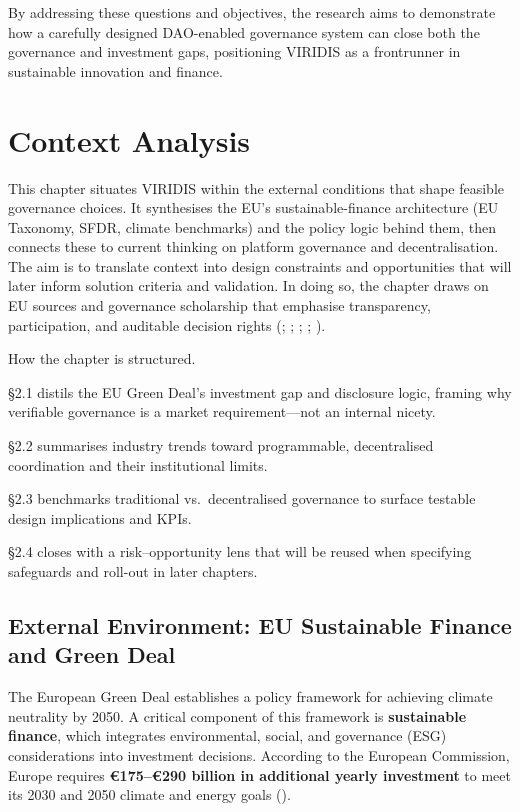 \documentclass[
  english,
  12pt,
  oneside,
  open=any]{scrbook}
\begin{document}
By addressing these questions and objectives, the research aims to
demonstrate how a carefully designed DAO-enabled governance system can
close both the governance and investment gaps, positioning VIRIDIS as a
frontrunner in sustainable innovation and finance.

\chapter{Context Analysis}\label{sec-context-analysis}

This chapter situates VIRIDIS within the external conditions that shape
feasible governance choices. It synthesises the EU's sustainable-finance
architecture (EU Taxonomy, SFDR, climate benchmarks) and the policy
logic behind them, then connects these to current thinking on platform
governance and decentralisation. The aim is to translate context into
design constraints and opportunities that will later inform solution
criteria and validation. In doing so, the chapter draws on EU sources
and governance scholarship that emphasise transparency, participation,
and auditable decision rights
(;
;
; ;
).

How the chapter is structured.

§2.1 distils the EU Green Deal's investment gap and disclosure logic,
framing why verifiable governance is a market requirement---not an
internal nicety.

§2.2 summarises industry trends toward programmable, decentralised
coordination and their institutional limits.

§2.3 benchmarks traditional vs.~decentralised governance to surface
testable design implications and KPIs.

§2.4 closes with a risk--opportunity lens that will be reused when
specifying safeguards and roll-out in later chapters.

\section{External Environment: EU Sustainable Finance and Green
Deal}\label{sec-eu}

The European Green Deal establishes a policy framework for achieving
climate neutrality by 2050. A critical component of this framework is
\textbf{sustainable finance}, which integrates environmental, social,
and governance (ESG) considerations into investment decisions. According
to the European Commission, Europe requires \textbf{€175--€290 billion
in additional yearly investment} to meet its 2030 and 2050 climate and
energy goals
().
\end{document}

